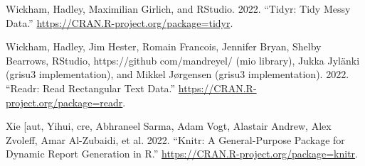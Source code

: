 \documentclass{article}
\newlength{\cslhangindent}
\newlength{\cslentryspacingunit} %
\newenvironment{CSLReferences}[2] %
 {%
  \setlength{\parindent}{0pt}
  \ifodd #1
  \let\oldpar\par
  \def\par{\hangindent=\cslhangindent\oldpar}
  \fi
  \setlength{\parskip}{#2\cslentryspacingunit}
 }%
 {}
\begin{document}
\begin{CSLReferences}{1}{0}
\leavevmode{}%
Wickham, Hadley, Maximilian Girlich, and RStudio. 2022. {``Tidyr: {Tidy}
{Messy} {Data}.''} \url{https://CRAN.R-project.org/package=tidyr}.

\leavevmode{}%
Wickham, Hadley, Jim Hester, Romain Francois, Jennifer Bryan, Shelby
Bearrows, RStudio, https://github com/mandreyel/ (mio library), Jukka
Jylänki (grisu3 implementation), and Mikkel Jørgensen (grisu3
implementation). 2022. {``Readr: {Read} {Rectangular} {Text} {Data}.''}
\url{https://CRAN.R-project.org/package=readr}.

\leavevmode{}%
Xie {[}aut, Yihui, cre, Abhraneel Sarma, Adam Vogt, Alastair Andrew,
Alex Zvoleff, Amar Al-Zubaidi, et al. 2022. {``Knitr: {A}
{General}-{Purpose} {Package} for {Dynamic} {Report} {Generation} in
{R}.''} \url{https://CRAN.R-project.org/package=knitr}.

\end{CSLReferences}



\end{document}
